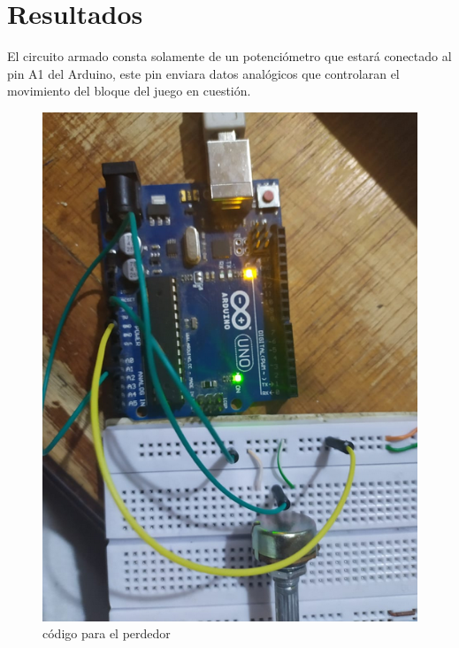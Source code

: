 \documentclass[10pt,a4paper]{article}
\begin{document}
\section{Resultados}
El circuito armado consta solamente de un potenciómetro que estará conectado al pin A1 del Arduino, este pin enviara datos analógicos que controlaran el movimiento del bloque del juego en cuestión.
\begin{figure}[H]
\centering
\includegraphics[scale=0.3]{circuito.PNG}
\caption{código para el perdedor}
\end{figure}
\end{document}
